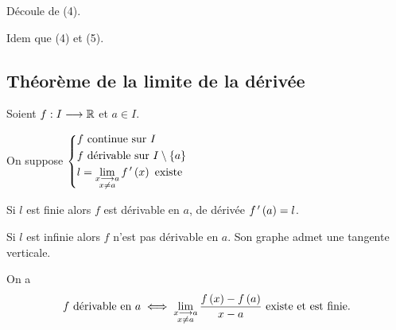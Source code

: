 \begin{dem}[5]
Découle de (4).
\end{dem}

\begin{dem}[6 et 7]
Idem que (4) et (5).
\end{dem}

\subsection{Théorème de la limite de la dérivée}

\begin{theo}
Soient \(f:I\longrightarrow\mathbb{R}\) et \(a\in I\).

On suppose \(\begin{dcases}f\text{ continue sur }I \\ f\text{ dérivable sur }I\setminus\left\lbrace a\right\rbrace \\ l=\lim_{\substack{x\longrightarrow a \\ x\not=a}}f^{\,\prime}\left(x\right)\text{ existe}\end{dcases}\)

Si \(l\) est finie alors \(f\) est dérivable en \(a\), de dérivée \(f^{\,\prime}\left(a\right)=l\).

Si \(l\) est infinie alors \(f\) n'est pas dérivable en \(a\). Son graphe admet une tangente verticale.
\end{theo}

\begin{rem}
On a \[f\text{ dérivable en }a\iff\lim_{\substack{x\longrightarrow a \\ x\not=a}}\dfrac{f\left(x\right)-f\left(a\right)}{x-a}\text{ existe et est finie}.\]
\end{rem}

